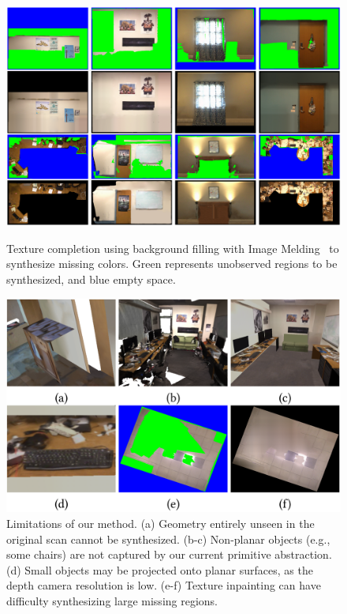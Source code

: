 \begin{figure}
\begin{minipage}{0.49\linewidth}
\centering
\includegraphics[width=\linewidth]{3dlite/fig20.png}
\caption{Texture completion using background filling with Image Melding~\cite{darabi2012image} to synthesize missing colors. Green represents unobserved regions to be synthesized, and blue empty space.}
\label{fig:3dlite-eval-complete}
\end{minipage}
\begin{minipage}{0.49\linewidth}
	\centering
    \includegraphics[width=\linewidth]{3dlite/fig21.png}
\caption{Limitations of our method. (a) Geometry entirely unseen in the original scan cannot be synthesized. (b-c) Non-planar objects (e.g., some chairs) are not captured by our current primitive abstraction. (d) Small objects may be projected onto planar surfaces, as the depth camera resolution is low. (e-f) Texture inpainting can have difficulty synthesizing large missing regions.}
	\label{fig:3dlite-limitation}
\end{minipage}
\end{figure}

